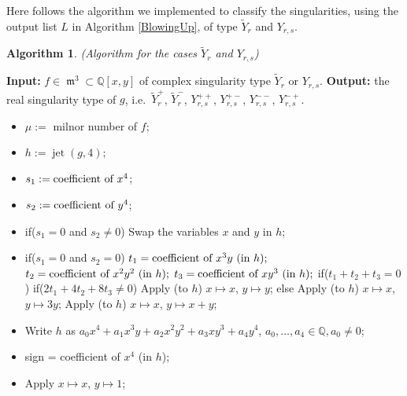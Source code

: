 \documentclass[noend]{amsproc}
\DeclareMathOperator{\m}{\mathfrak{m}}
\DeclareMathOperator{\jt}{jet}
\begin{document}
Here follows the algorithm we implemented to classify the singularities, using
the output list $L$ in Algorithm \ref{BlowingUp}, of type $\widetilde Y_r$ and
$Y_{r,s}$.

\newtheorem{Y[1}[kjet]{Algorithm}
\begin{Y[1}(Algorithm for the cases $\widetilde Y_r$ and $Y_{r,s}$)%
\label{Y[r,s]}
\end{Y[1}
\noindent\textnormal{\bf Input:} $f\in \m^3\subset\mathbb Q[x,y]$ of complex
singularity type $\widetilde Y_r$ or $Y_{r,s}$.\newline
\textnormal{\bf Output:} the real singularity type of $g$,
i.e.~$\widetilde Y_r^+$, $\widetilde Y_r^-$, $Y_{r,s}^{++}$, $Y_{r,s}^{+-}$,
$Y_{r,s}^{--}$, $Y_{r,s}^{-+}$.
\begin{itemize}
\item $\mu :=$ milnor number of $f$;
\item $h :=  \jt(g,4);$
\item $s_1 := \textnormal{coefficient of }x^4$;
\item $s_2 := \textnormal{coefficient of }y^4$;
\item if($s_1=0$ and $s_2\neq 0$)\newline
\phantom{}\quad Swap the variables $x$ and $y$ in $h$;
\item if($s_1=0$ and $s_2=0$)\newline
\phantom{}\quad $t_1=\textnormal{coefficient of }x^3y\ (\textnormal{in } h);$
\newline
\phantom{}\quad $t_2=\textnormal{coefficient of }x^2y^2\ (\textnormal{in } h);$
\newline
\phantom{}\quad $t_3=\textnormal{coefficient of }xy^3\ (\textnormal{in } h);$
\newline
\phantom{}\quad if($t_1+t_2+t_3=0$)\newline
\phantom{}\quad\quad if($2t_1+4t_2+8t_3\neq 0$)\newline
\phantom{}\quad\quad\quad Apply (to $h$) $x\mapsto x$, $y\mapsto y$;\newline
\phantom{}\quad\quad else\newline
\phantom{}\quad\quad\quad Apply (to $h$) $x\mapsto x$, $y\mapsto 3y$;\newline
\phantom{}\quad\quad Apply (to $h$) $x\mapsto x$, $y\mapsto x+y$;
\item Write $h$ as $a_0x^4+a_1x^3y+a_2x^2y^2+a_3xy^3+a_4y^4$,
$a_0,\ldots,a_4\in\mathbb Q, a_0\neq 0$;
\item sign = coefficient of $x^4$ (in $h$);
\item Apply $x\mapsto x$, $y\mapsto 1$;

\end{itemize}
\end{document}
